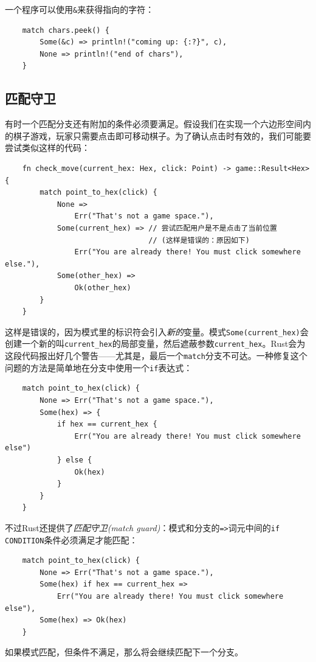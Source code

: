 一个程序可以使用\texttt{\&}来获得指向的字符：
\begin{verbatim}
    match chars.peek() {
        Some(&c) => println!("coming up: {:?}", c),
        None => println!("end of chars"),
    }
\end{verbatim}

\subsection{匹配守卫}
有时一个匹配分支还有附加的条件必须要满足。假设我们在实现一个六边形空间内的棋子游戏，玩家只需要点击即可移动棋子。为了确认点击时有效的，我们可能要尝试类似这样的代码：
\begin{verbatim}
    fn check_move(current_hex: Hex, click: Point) -> game::Result<Hex> {
        match point_to_hex(click) {
            None =>
                Err("That's not a game space."),
            Some(current_hex) => // 尝试匹配用户是不是点击了当前位置
                                 // (这样是错误的：原因如下)
                Err("You are already there! You must click somewhere else."),
            Some(other_hex) =>
                Ok(other_hex)
        }
    }
\end{verbatim}

这样是错误的，因为模式里的标识符会引入\emph{新的}变量。模式\texttt{Some(current\_hex)}会创建一个新的叫\texttt{current\_hex}的局部变量，然后遮蔽参数\texttt{current\_hex}。Rust会为这段代码报出好几个警告——尤其是，最后一个\texttt{match}分支不可达。一种修复这个问题的方法是简单地在分支中使用一个\texttt{if}表达式：
\begin{verbatim}
    match point_to_hex(click) {
        None => Err("That's not a game space."),
        Some(hex) => {
            if hex == current_hex {
                Err("You are already there! You must click somewhere else")
            } else {
                Ok(hex)
            }
        }
    }
\end{verbatim}

不过Rust还提供了\emph{匹配守卫(match guard)}：模式和分支的\texttt{=>}词元中间的\texttt{if CONDITION}条件必须满足才能匹配：
\begin{verbatim}
    match point_to_hex(click) {
        None => Err("That's not a game space."),
        Some(hex) if hex == current_hex =>
            Err("You are already there! You must click somewhere else"),
        Some(hex) => Ok(hex)
    }
\end{verbatim}

如果模式匹配，但条件不满足，那么将会继续匹配下一个分支。

